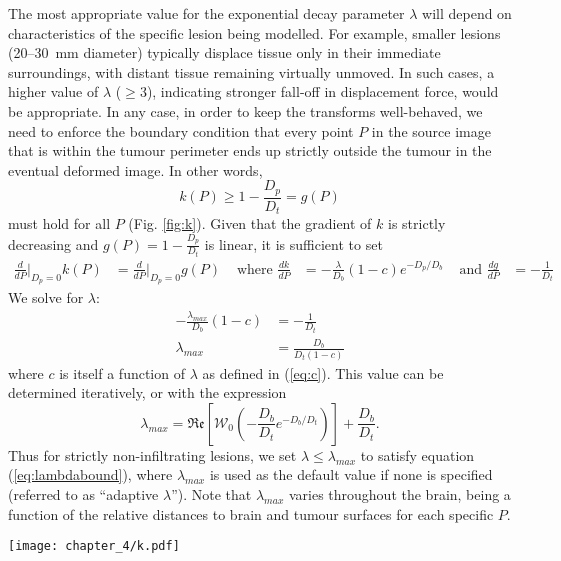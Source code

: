 The most appropriate value for the exponential decay parameter $\lambda$ will depend on characteristics of the specific lesion being modelled.
For example, smaller lesions (20--30~mm diameter) typically displace tissue only in their immediate surroundings, with distant tissue remaining virtually unmoved.
In such cases, a higher value of $\lambda$ ($\geq 3$), indicating stronger fall-off in displacement force, would be appropriate.
In any case, in order to keep the transforms well-behaved, we need to enforce the boundary condition that every point $P$ in the source image that is within the tumour perimeter ends up strictly outside the tumour in the eventual deformed image.
In other words,
%
\begin{equation}\label{eq:lambdabound}
  k(P) \geq 1 - \frac{D_p}{D_t} = g(P)
\end{equation}
%
must hold for all $P$ (Fig. \ref{fig:k}).
Given that the gradient of $k$ is strictly decreasing and $g(P) = 1 - \frac{D_p}{D_t}$ is linear, it is sufficient to set
\begin{align*}
  \frac{d}{dP}\bigg\rvert_{D_p=0}k(P) &= \frac{d}{dP}\bigg\rvert_{D_p=0}g(P) &\text{ where } \frac{dk}{dP} &= -\frac{\lambda}{D_b}(1-c)e^{-D_p/D_b} &\text{ and } \frac{dg}{dP} &= -\frac{1}{D_t}
\end{align*}
%
We solve for $\lambda$:
%
\begin{align*}
  -\frac{\lambda_{max}}{D_b}(1-c) &= -\frac{1}{D_t} \\
  \lambda_{max} &= \frac{D_b}{D_t (1-c)}
\end{align*}
%
where $c$ is itself a function of $\lambda$ as defined in (\ref{eq:c}). This value can be determined iteratively, or with the expression
%
\begin{equation}
  \lambda_{max} = \mathfrak{Re} \left[ \mathcal{W}_0(-\frac{D_b}{D_t}e^{-D_b/D_t}) \right] +\frac{D_b}{D_t}.
\end{equation}
%
Thus for strictly non-infiltrating lesions, we set $\lambda \leq \lambda_{max}$ to satisfy equation (\ref{eq:lambdabound}), where $\lambda_{max}$ is used as the default value if none is specified (referred to as ``adaptive $\lambda$'').
Note that $\lambda_{max}$ varies throughout the brain, being a function of the relative distances to brain and tumour surfaces for each specific $P$.

\begin{SCfigure}[][h!]
  \texttt{[image: chapter\_4/k.pdf]}
  \caption[Deformation factor k]{Deformation factor $k$ as a function of $D_p$. $\lambda$ must be small enough such that $k_{\lambda}$ is strictly above the line $1-(\frac{D_p}{D_t})$ (dashed line). An exponential $k$ with $\lambda_{max}$ is plotted in solid black, compared with a linear $k$ as proposed in \textcite{Nowinski2005} (dotted line).}
  \label{fig:k}
\end{SCfigure}


